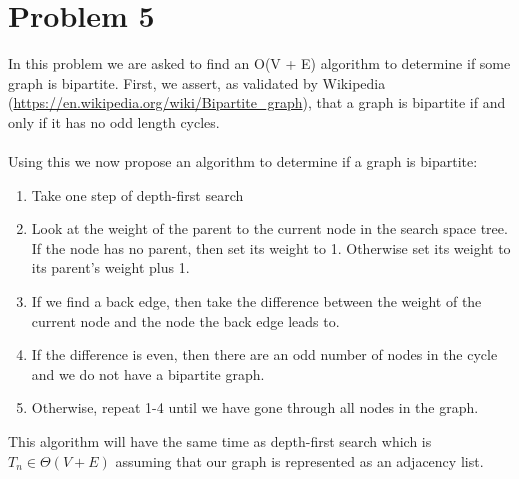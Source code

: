 \section*{Problem 5}

In this problem we are asked to find an O(V + E) algorithm to determine
if some graph is bipartite. First, we assert, as validated by Wikipedia
(\url{https://en.wikipedia.org/wiki/Bipartite_graph}), that a graph is 
bipartite if and only if it has no odd length cycles.
\\
\\
Using this we now propose an algorithm to determine if a graph is 
bipartite:

\begin{enumerate}[noitemsep]
    \item Take one step of depth-first search
    \item Look at the weight of the parent to the current node in the
          search space tree. If the node has no parent, then set its 
          weight to 1. Otherwise set its weight to its parent's weight
          plus 1.
    \item If we find a back edge, then take the difference between the 
          weight of the current node and the node the back edge leads
          to. 
    \item If the difference is even, then there are an odd number of
          nodes in the cycle and we do not have a bipartite graph.
    \item Otherwise, repeat 1-4 until we have gone through all nodes in the 
          graph.
\end{enumerate}
%
This algorithm will have the same time as depth-first search which is \newline
$T_n \in \Theta(V + E)$ assuming that our graph is represented as an adjacency 
list.
